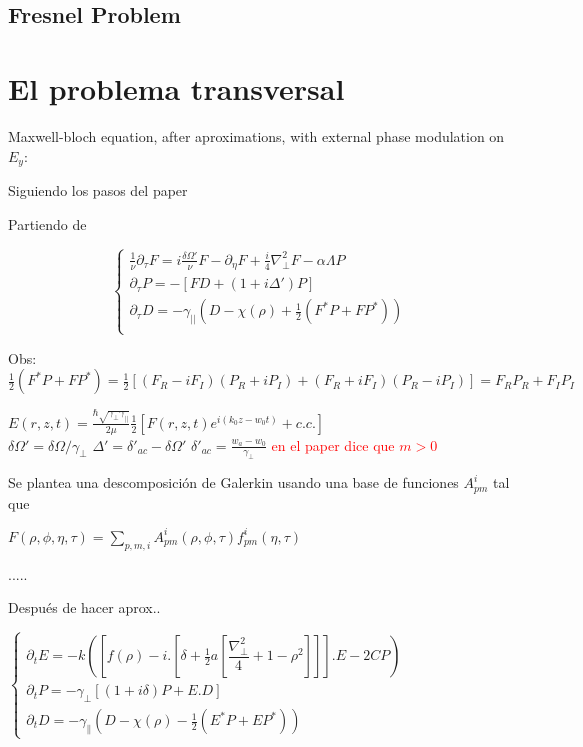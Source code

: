 	\begin{center}
		\section*{Fresnel Problem}
	\end{center}
	
\section{El problema transversal}

	
	Maxwell-bloch equation, after aproximations, with external phase modulation on $E_y$:
	
	Siguiendo los pasos del paper  \cite{Lugiato:90}
	
	Partiendo de 
	
	\[
	\begin{cases}
	\frac{1}{\nu} \partial_{\tau}F=i \frac{\delta \Omega'}{\nu}F -\partial_{\eta}F +\frac{i}{4}\nabla^2_{\bot} F -\alpha \Lambda P \\
	\partial_{\tau} P=-[FD + (1+i\Delta')P] \\
	\partial_{\tau} D=-\gamma_{||}(D-\chi(\rho)+\tfrac{1}{2}(F^*P+FP^*)) \\
	\end{cases}
	\]
	
	Obs: \[\tfrac{1}{2}(F^*P+FP^*)=\tfrac{1}{2}[(F_R-iF_I)(P_R+iP_I)+(F_R+iF_I)(P_R-iP_I)]=F_RP_R+F_IP_I\]
	
	
	$E(r,z,t)=\frac{\hbar \sqrt{ \gamma_{\bot} \gamma_{||} }}{2\mu } \frac{1}{2} [F(r,z,t) e^{i(k_0 z - w_0 t)} + c.c.]$\\
	
	$\delta \Omega'=\delta \Omega /\gamma_{\bot}$
	$\Delta'=\delta'_{ac}-\delta \Omega'$
	$\delta'_{ac}=\frac{w_a-w_0}{\gamma_{\bot}}$
	\textcolor{red}{en el paper dice que $m>0$}
	
	Se plantea una descomposición de Galerkin usando una base de funciones $A^i_{pm}$ tal que
	
	$F(\rho,\phi,\eta,\tau)=\sum_{p,m,i} A^i_{pm}(\rho,\phi,\tau) f^i_{pm}(\eta,\tau)$
	
	.....
	

	 
	 
	Después de hacer aprox..
	
	
	$\begin{cases}
	\partial_t E=-k\left([f(\rho)-i.\left[\delta+\frac{1}{2}a\left[\dfrac{\nabla^2_{\bot}}{4}+1-\rho^2\right]\right]].E-2CP\right)\\
	\partial_t P=-\gamma_{\bot}[(1+i\delta)P+E.D]\\
	\partial_t D=-\gamma_{\parallel}(D-\chi(\rho)-\frac{1}{2}(E^*P+EP^*))
	\end{cases}$
	

